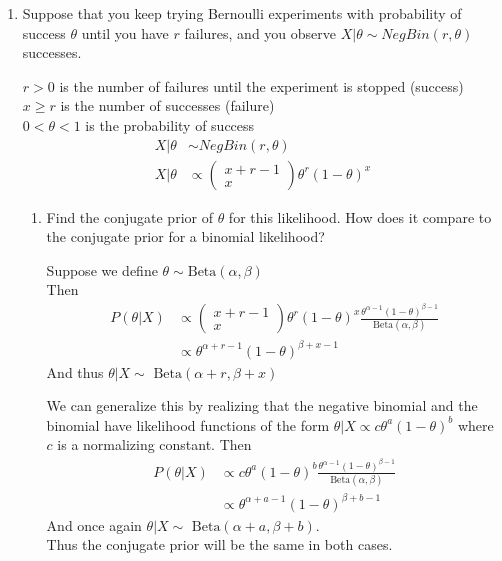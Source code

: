 \documentclass[11pt]{article}
\newcommand{\Beta}{\text{ Beta}}
\theoremstyle{definition}
\theoremstyle{remark}
\theoremstyle{definition}
\begin{document}
\begin{enumerate}
\begin{enumerate}
\end{enumerate}

\rule{0.94\textwidth}{0.4pt}
\item Suppose that you keep trying Bernoulli experiments with probability of success $\theta$ until you have $r$ failures, and you observe $X | \theta \sim NegBin(r, \theta)$ successes.
	

	$r > 0 $ is the number of failures until the experiment is stopped (success)\\
	$x \geq r $ is the number of successes (failure)\\
	$0 < \theta < 1$ is the probability of success
	\begin{align*}
		X|\theta &\sim NegBin(r, \theta)\\
		X|\theta &\propto \left( \begin{array}{c} x + r -1 \\ x \end{array} \right)\theta^r (1-\theta)^x
	\end{align*}
	
	
	\begin{enumerate}
		\item Find the conjugate prior of $\theta$ for this likelihood. How does it compare to the conjugate prior for a binomial likelihood?

			Suppose we define $\theta \sim \text{Beta}(\alpha,\beta)$\\
			Then 
\begin{align*}
	P(\theta|X) &\propto \left( \begin{array}{c} x + r -1 \\ x \end{array} \right)\theta^r (1-\theta)^x  \frac{\theta^{\alpha-1}(1-\theta)^{\beta -1}}{\text{Beta}(\alpha,\beta)}\\
	&\propto \theta^{\alpha+r-1} (1-\theta)^{\beta+x-1}
\end{align*}
And thus $\theta|X \sim \Beta (\alpha+r , \beta+x)$

We can generalize this by realizing that the negative binomial and the binomial have likelihood functions of the form $\theta|X \propto c \theta^a (1-\theta)^b $ where $c$ is a normalizing constant. 
Then \begin{align*}
	P(\theta|X) &\propto c\theta^a (1-\theta)^b  \frac{\theta^{\alpha-1}(1-\theta)^{\beta -1}}{\text{Beta}(\alpha,\beta)}\\
	&\propto \theta^{\alpha+a-1} (1-\theta)^{\beta+b-1}
\end{align*}
And once again $\theta|X \sim \Beta (\alpha+a , \beta+b)$. \\
Thus the conjugate prior will be the same in both cases.  


\end{enumerate}
\end{enumerate}
\end{document}
